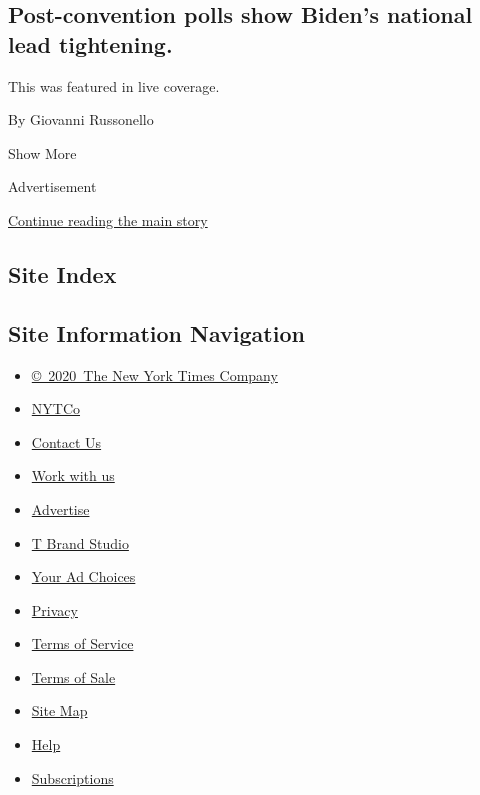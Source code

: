 \begin{enumerate}
  \hypertarget{post-convention-polls-show-bidens-national-lead-tightening}{%
  \subsection{Post-convention polls show Biden's national lead
  tightening.}\label{post-convention-polls-show-bidens-national-lead-tightening}}

  This was featured in live coverage.

  By Giovanni Russonello
\end{enumerate}

Show More

Advertisement

\protect\hyperlink{after-mid2}{Continue reading the main story}

\hypertarget{site-index}{%
\subsection{Site Index}\label{site-index}}

\hypertarget{site-information-navigation}{%
\subsection{Site Information
Navigation}\label{site-information-navigation}}

\begin{itemize}
\tightlist
\item
  \href{https://help.nytimes3xbfgragh.onion/hc/en-us/articles/115014792127-Copyright-notice}{©~2020~The
  New York Times Company}
\end{itemize}

\begin{itemize}
\tightlist
\item
  \href{https://www.nytco.com/}{NYTCo}
\item
  \href{https://help.nytimes3xbfgragh.onion/hc/en-us/articles/115015385887-Contact-Us}{Contact
  Us}
\item
  \href{https://www.nytco.com/careers/}{Work with us}
\item
  \href{https://nytmediakit.com/}{Advertise}
\item
  \href{http://www.tbrandstudio.com/}{T Brand Studio}
\item
  \href{https://www.nytimes3xbfgragh.onion/privacy/cookie-policy\#how-do-i-manage-trackers}{Your
  Ad Choices}
\item
  \href{https://www.nytimes3xbfgragh.onion/privacy}{Privacy}
\item
  \href{https://help.nytimes3xbfgragh.onion/hc/en-us/articles/115014893428-Terms-of-service}{Terms
  of Service}
\item
  \href{https://help.nytimes3xbfgragh.onion/hc/en-us/articles/115014893968-Terms-of-sale}{Terms
  of Sale}
\item
  \href{https://spiderbites.nytimes3xbfgragh.onion}{Site Map}
\item
  \href{https://help.nytimes3xbfgragh.onion/hc/en-us}{Help}
\item
  \href{https://www.nytimes3xbfgragh.onion/subscription?campaignId=37WXW}{Subscriptions}
\end{itemize}
